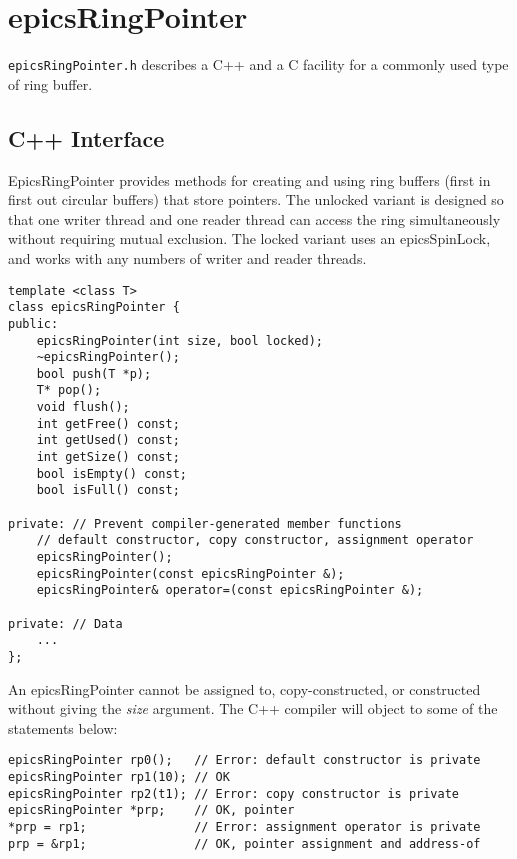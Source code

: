 \section{epicsRingPointer}

\verb|epicsRingPointer.h| describes a C++ and a C facility for a commonly used type of ring buffer.

\subsection{C++ Interface}

EpicsRingPointer provides methods for creating and using ring buffers (first in first out circular buffers) that store pointers.
The unlocked variant is designed so that one writer thread and one reader thread can access the ring simultaneously without requiring mutual exclusion.
The locked variant uses an epicsSpinLock, and works with any numbers of writer and reader threads.

\begin{verbatim}
template <class T>
class epicsRingPointer {
public:
    epicsRingPointer(int size, bool locked);
    ~epicsRingPointer();
    bool push(T *p);
    T* pop();
    void flush();
    int getFree() const;
    int getUsed() const;
    int getSize() const;
    bool isEmpty() const;
    bool isFull() const;

private: // Prevent compiler-generated member functions
    // default constructor, copy constructor, assignment operator
    epicsRingPointer();
    epicsRingPointer(const epicsRingPointer &);
    epicsRingPointer& operator=(const epicsRingPointer &);

private: // Data
    ...
};
\end{verbatim}

An epicsRingPointer cannot be assigned to, copy-constructed, or constructed without giving the \emph{size} argument.
The C++ compiler will object to some of the statements below:

\begin{verbatim}
epicsRingPointer rp0();   // Error: default constructor is private
epicsRingPointer rp1(10); // OK
epicsRingPointer rp2(t1); // Error: copy constructor is private
epicsRingPointer *prp;    // OK, pointer
*prp = rp1;               // Error: assignment operator is private
prp = &rp1;               // OK, pointer assignment and address-of
\end{verbatim}

